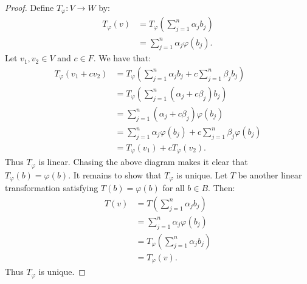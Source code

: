         \begin{proof}
            Define $T_\varphi:V \rightarrow W$ by:
                \begin{equation*}
                \begin{split}
                    T_\varphi(v)
                    & = T_\varphi \left( \sum_{j = 1}^n \alpha_j b_j \right) \\
                    & = \sum_{j = 1}^n \alpha_j \varphi(b_j).
                \end{split}
                \end{equation*}
            Let $v_1,v_2 \in V$ and $c \in F$. We have that:
                \begin{equation*}
                \begin{split}
                    T_\varphi(v_1 + cv_2)
                    & = T_\varphi \left( \sum_{j = 1}^n \alpha_j b_j + c \sum_{j = 1}^n \beta_j b_j \right) \\
                    & = T_\varphi \left( \sum_{j = 1}^n (\alpha_j + c \beta_j)b_j \right) \\
                    & = \sum_{j  =1}^n (\alpha_j + c \beta_j)\varphi(b_j) \\
                    & = \sum_{j = 1}^n \alpha_j \varphi(b_j) + c \sum_{j =1}^n \beta_j \varphi(b_j) \\
                    & = T_\varphi(v_1) + c T_\varphi(v_2).
                \end{split}
                \end{equation*}
            Thus $T_\varphi$ is linear. Chasing the above diagram makes it clear that $T_\varphi(b) = \varphi(b)$. It remains to show that $T_\varphi$ is unique. Let $T$ be another linear transformation satisfying $T(b) = \varphi(b)$ for all $b \in B$. Then:
                \begin{equation*}
                \begin{split}
                    T(v)
                    & = T \left( \sum_{j = 1}^n \alpha_j b_j \right) \\
                    & = \sum_{j = 1}^n \alpha_j \varphi(b_j) \\
                    & = T_\varphi \left( \sum_{j = 1}^n \alpha_j b_j \right) \\
                    & = T_\varphi(v).
                \end{split}
                \end{equation*}
            Thus $T_\varphi$ is unique.
        \end{proof}

